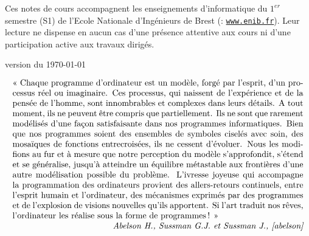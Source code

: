 \documentclass[11pt,a4paper,landscape,colorlinks,breaklinks]{book}
\theoremstyle{mybreak}
\begin{document}
\begin{titlepage}
\noindent Ces notes de cours accompagnent les enseignements d'informatique 
du $1^{er}$ semestre (S1) de l'Ecole Nationale d'Ingénieurs 
de Brest (\enib : \href{http://www.enib.fr}{\tt www.enib.fr}). 
Leur lecture ne dispense en aucun cas
d'une présence attentive aux cours 
ni d'une participation active aux travaux dirigés.
\vspace*{0.5cm}

\centerline{\tiny version du \today}
\mbox{}

\end{titlepage}

\null\vfill

	$$\begin{minipage}{12cm}\label{cite:abelson}
	« Chaque programme d'ordinateur est un modèle, forgé par l'esprit, d'un
	processus réel ou imaginaire. Ces processus, qui naissent de l'expérience et
	de la pensée de l'homme, sont innombrables et complexes dans leurs détails. 
	A tout moment, ils ne peuvent être compris que partiellement. 
	Ils ne sont que rarement modélisés d'une façon satisfaisante dans
	nos programmes informatiques. Bien que nos programmes soient des ensembles
	de symboles ciselés avec soin, des mosaïques de fonctions
	entrecroisées, ils ne cessent d'évoluer. 
	Nous les modifions au fur et à mesure que notre perception du modèle
	s'approfondit, s'étend et se généralise, jusqu'à atteindre un 
	équilibre métastable aux frontières d'une autre modélisation
	possible du problème. L'ivresse joyeuse qui accompagne la
	programmation des ordinateurs provient des allers-retours continuels,
	entre l'esprit humain et l'ordinateur, des mécanismes exprimés par
	des programmes et de l'explosion de visions nouvelles qu'ils apportent.
	Si l'art traduit nos rêves, l'ordinateur les réalise sous la forme de 
	programmes\,! »\\\mbox{}\hfill
	{\em Abelson H., Sussman G.J. et Sussman J., \cite{abelson}}
	\end{minipage}$$
\null\vfill

\end{document}
